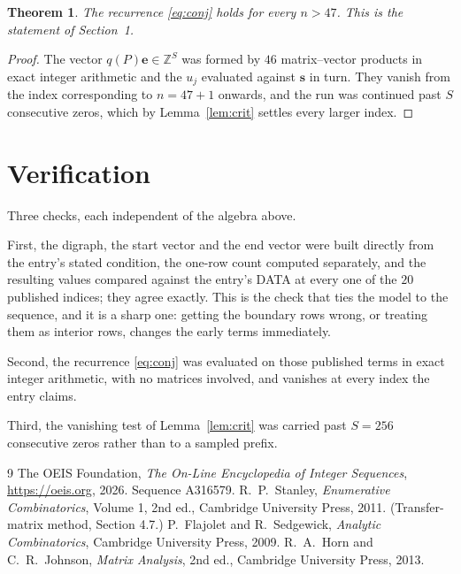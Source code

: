 \documentclass[11pt,a4paper]{article}
\theoremstyle{plain}
\newtheorem{theorem}{Theorem}
\theoremstyle{definition}
\begin{document}
\begin{theorem}
The recurrence \eqref{eq:conj} holds for every $n>47$. This is the statement of
Section~1.
\end{theorem}

\begin{proof}
The vector $q(P)\mathbf{e}\in\mathbb{Z}^{S}$ was formed by $46$ matrix--vector
products in exact integer arithmetic and the $u_j$ evaluated against $\mathbf{s}$ in turn.
They vanish from the index corresponding to $n=47+1$ onwards, and the run was continued
past $S$ consecutive zeros, which by Lemma~\ref{lem:crit} settles every larger index.
\end{proof}

\section{Verification}

Three checks, each independent of the algebra above.

First, the digraph, the start vector and the end vector were built directly from the
entry's stated condition, the one-row count computed separately, and the resulting values
compared against the entry's DATA at every one of the $20$ published indices; they
agree exactly. This is the check that ties the model to the sequence, and it is a sharp one:
getting the boundary rows wrong, or treating them as interior rows, changes the early terms
immediately.

Second, the recurrence \eqref{eq:conj} was evaluated on those published terms in exact
integer arithmetic, with no matrices involved, and vanishes at every index the entry claims.

Third, the vanishing test of Lemma~\ref{lem:crit} was carried past $S=256$ consecutive
zeros rather than to a sampled prefix.

\begin{thebibliography}{9}
 The OEIS Foundation, \emph{The On-Line Encyclopedia of Integer
Sequences}, \url{https://oeis.org}, 2026. Sequence A316579.
 R.~P.~Stanley, \emph{Enumerative Combinatorics}, Volume 1, 2nd ed.,
Cambridge University Press, 2011. (Transfer-matrix method, Section 4.7.)
 P.~Flajolet and R.~Sedgewick, \emph{Analytic Combinatorics}, Cambridge
University Press, 2009.
 R.~A.~Horn and C.~R.~Johnson, \emph{Matrix Analysis}, 2nd ed., Cambridge
University Press, 2013.
\end{thebibliography}
\end{document}
